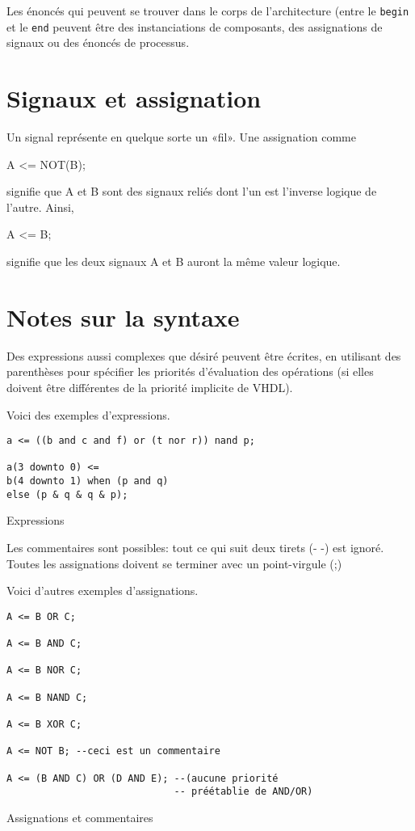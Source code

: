 \documentclass[letter, oneside]{book}
\begin{document}
Les énoncés qui peuvent se trouver dans le corps de l'architecture
(entre le \texttt{begin} et le \texttt{end} peuvent être des instanciations de
composants, des assignations de signaux ou des énoncés de processus.

\section{Signaux et assignation}
\label{sec:org03001eb}

Un signal représente en quelque sorte un «fil». Une assignation comme

A <= NOT(B);

signifie que A et B sont des signaux reliés dont l'un est l'inverse
logique de l'autre.  Ainsi,

A <= B; 

signifie que les deux signaux A et B auront la même valeur logique.

\section{Notes sur la syntaxe}
\label{sec:orgb9c0b12}

Des expressions aussi complexes que désiré peuvent être écrites, en
utilisant des parenthèses pour spécifier les priorités d'évaluation
des opérations (si elles doivent être différentes de la priorité
implicite de VHDL).

Voici des exemples d'expressions.
\begin{listing}[htbp]
\begin{verbatim}
a <= ((b and c and f) or (t nor r)) nand p;

a(3 downto 0) <=
b(4 downto 1) when (p and q)
else (p & q & q & p);
\end{verbatim}
\caption{Expressions}
\end{listing}

Les commentaires sont possibles: tout ce qui suit deux tirets (- -)
est ignoré.  Toutes les assignations doivent se terminer avec un
point-virgule (;)

Voici d'autres exemples d'assignations.

\begin{listing}[htbp]
\begin{verbatim}
A <= B OR C;

A <= B AND C;

A <= B NOR C;

A <= B NAND C;

A <= B XOR C;

A <= NOT B; --ceci est un commentaire

A <= (B AND C) OR (D AND E); --(aucune priorité 
                             -- préétablie de AND/OR)
\end{verbatim}
\caption{Assignations et commentaires}
\end{listing}
\end{document}
